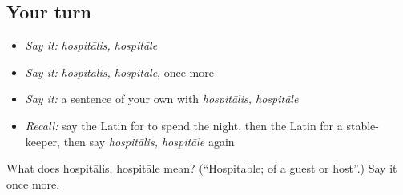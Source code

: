 \subsection*{Your turn}
\begin{itemize}
\raggedright
  \item \emph{Say it:} \emph{hospitālis, hospitāle}
  \item \emph{Say it:} \emph{hospitālis, hospitāle}, once more
  \item \emph{Say it:} a sentence of your own with \emph{hospitālis, hospitāle}
  \item \emph{Recall:} say the Latin for to spend the night, then the Latin for a stable-keeper, then say \emph{hospitālis, hospitāle} again
\end{itemize}

\begin{tcolorbox}[breakable,colback=teal!4,colframe=teal!35!black,title={Before you move on}]
What does hospitālis, hospitāle mean? (\textquotedblleft{}Hospitable; of a guest or host\textquotedblright{}.) Say it once more.
\end{tcolorbox}
